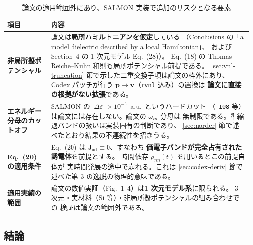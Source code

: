 \documentclass[dvipdfmx,a4paper,11pt]{jsarticle}
\newcommand{\file}[1]{\texttt{#1}}
\newcommand{\vp}{\bm{p}}
\newcommand{\vv}{\bm{v}}
\newcommand{\eps}{\varepsilon}
\begin{document}
\begin{table}[htbp]
\centering
\caption{論文の適用範囲外にあり、SALMON 実装で追加のリスクとなる要素}
\label{tab:vlad-outofscope}
\begin{tabular}{@{}p{40mm}p{105mm}@{}}
\toprule
\textbf{項目} & \textbf{内容} \\
\midrule
\textbf{非局所擬ポテンシャル} &
論文は\textbf{局所ハミルトニアンを仮定}している
（Conclusions の「a model dielectric described by a local Hamiltonian」、
 および Section~4 の 1 次元モデル Eq.~(28)）。
Eq.~(18) の Thomas--Reiche--Kuhn 和則も局所ポテンシャル前提である。
\ref{sec:vnl-truncation} 節で示した二重交換子項は論文の枠外にあり、
Codex パッチが行う $\vp\to\vv$（\file{rvnl} 込み）の置換は
\textbf{論文に直接の根拠がない拡張}である。 \\[2mm]

\textbf{エネルギー分母の\newline カットオフ} &
SALMON の $|\Delta\eps| > 10^{-3}$~a.u.\ というハードカット
（\file{:108} 等）は論文には存在しない。論文の $\omega_{in}$ 分母は
無制限である。準縮退バンドの扱いは実装固有の判断であり、
\ref{sec:norder} 節で述べたとおり結果の不連続性を招きうる。 \\[2mm]

\textbf{Eq.~(20) の適用条件} &
Eq.~(20) は $\mathbf{J}_{\mathrm{ad}}\equiv 0$、すなわち
\textbf{価電子バンドが完全占有された誘電体}を前提とする。
時間依存 $\rho_{nn}(t)$ を用いるとこの前提自体が
実時間発展の途中で崩れる。これは
\ref{sec:codex-deriv} 節で述べた第 3 の逸脱の物理的意味である。 \\[2mm]

\textbf{適用実績の範囲} &
論文の数値実証（Fig.~1--4）は\textbf{1 次元モデル系}に限られる。
3 次元・実材料（Si 等）・非局所擬ポテンシャルの組み合わせでの
検証は論文の範囲外である。 \\
\bottomrule
\end{tabular}
\end{table}

\subsection{結論}
\end{document}
